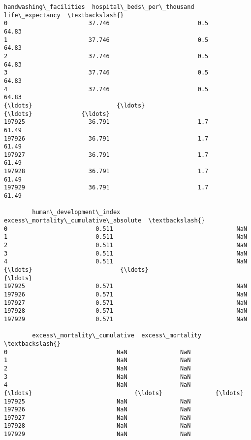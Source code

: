 \documentclass[11pt]{article}
\begin{document}
\begin{tcolorbox}[breakable, size=fbox, boxrule=.5pt, pad at break*=1mm, opacityfill=0]
\begin{Verbatim}[commandchars=\\\{\}]
        handwashing\_facilities  hospital\_beds\_per\_thousand  life\_expectancy  \textbackslash{}
0                       37.746                         0.5            64.83
1                       37.746                         0.5            64.83
2                       37.746                         0.5            64.83
3                       37.746                         0.5            64.83
4                       37.746                         0.5            64.83
{\ldots}                        {\ldots}                         {\ldots}              {\ldots}
197925                  36.791                         1.7            61.49
197926                  36.791                         1.7            61.49
197927                  36.791                         1.7            61.49
197928                  36.791                         1.7            61.49
197929                  36.791                         1.7            61.49

        human\_development\_index  excess\_mortality\_cumulative\_absolute  \textbackslash{}
0                         0.511                                   NaN
1                         0.511                                   NaN
2                         0.511                                   NaN
3                         0.511                                   NaN
4                         0.511                                   NaN
{\ldots}                         {\ldots}                                   {\ldots}
197925                    0.571                                   NaN
197926                    0.571                                   NaN
197927                    0.571                                   NaN
197928                    0.571                                   NaN
197929                    0.571                                   NaN

        excess\_mortality\_cumulative  excess\_mortality  \textbackslash{}
0                               NaN               NaN
1                               NaN               NaN
2                               NaN               NaN
3                               NaN               NaN
4                               NaN               NaN
{\ldots}                             {\ldots}               {\ldots}
197925                          NaN               NaN
197926                          NaN               NaN
197927                          NaN               NaN
197928                          NaN               NaN
197929                          NaN               NaN


\end{Verbatim}
\end{tcolorbox}
\end{document}
